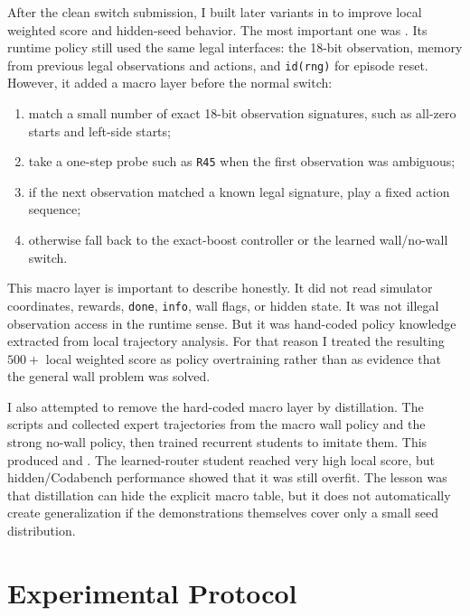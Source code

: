 \documentclass[11pt]{article}
\begin{document}
After the clean switch submission, I built later variants in  to
improve local weighted score and hidden-seed behavior. The most important one was
. Its runtime policy still used the same legal
interfaces: the 18-bit observation, memory from previous legal observations and actions,
and \texttt{id(rng)} for episode reset. However, it added a macro layer before the normal
switch:
\begin{enumerate}[leftmargin=1.5em]
  \item match a small number of exact 18-bit observation signatures, such as all-zero
  starts and left-side starts;
  \item take a one-step probe such as \texttt{R45} when the first observation was
  ambiguous;
  \item if the next observation matched a known legal signature, play a fixed action
  sequence;
  \item otherwise fall back to the exact-boost controller or the learned wall/no-wall
  switch.
\end{enumerate}

This macro layer is important to describe honestly. It did not read simulator
coordinates, rewards, \texttt{done}, \texttt{info}, wall flags, or hidden state. It was
not illegal observation access in the runtime sense. But it was hand-coded policy
knowledge extracted from local trajectory analysis. For that reason I treated the
resulting \(500+\) local weighted score as policy overtraining rather than as evidence
that the general wall problem was solved.

I also attempted to remove the hard-coded macro layer by distillation. The scripts
 and  collected
expert trajectories from the macro wall policy and the strong no-wall policy, then
trained recurrent students to imitate them. This produced
 and
. The learned-router student reached
very high local score, but hidden/Codabench performance showed that it was still
overfit. The lesson was that distillation can hide the explicit macro table, but it does
not automatically create generalization if the demonstrations themselves cover only a
small seed distribution.

\section{Experimental Protocol}
\end{document}
